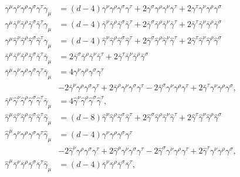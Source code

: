 \documentclass[../FeynCalcManual.tex]{subfiles}
\begin{document}
\begin{align}
\gamma^\mu \gamma^\nu \gamma^\rho \gamma^\sigma \gamma^\tau \gamma_\mu &= (d-4) \gamma^\nu \gamma^\rho \gamma^\sigma \gamma^\tau + 2 \gamma^\sigma \gamma^\rho \gamma^\nu \gamma^\tau + 2 \gamma^\tau \gamma^\nu \gamma^\rho \gamma^\sigma \\
\gamma^\mu \bar{\gamma}^\nu \bar{\gamma}^\rho \bar{\gamma}^\sigma \bar{\gamma}^\tau \gamma_\mu &= (d-4) \bar{\gamma}^\nu \bar{\gamma}^\rho \bar{\gamma}^\sigma \bar{\gamma}^\tau + 2 \bar{\gamma}^\sigma \bar{\gamma}^\rho \bar{\gamma}^\nu  \bar{\gamma}^\tau + 2 \bar{\gamma}^\tau \bar{\gamma}^\nu \bar{\gamma}^\rho  \bar{\gamma}^\sigma \\
\gamma^\mu \hat{\gamma}^\nu \hat{\gamma}^\rho \hat{\gamma}^\sigma \hat{\gamma}^\tau \gamma_\mu &= (d-4) \hat{\gamma}^\nu \hat{\gamma}^\rho \hat{\gamma}^\sigma \hat{\gamma}^\tau +2 \hat{\gamma}^\sigma \hat{\gamma}^\rho \hat{\gamma}^\nu \hat{\gamma}^\tau + 2\hat{\gamma}^\tau \hat{\gamma}^\nu \hat{\gamma}^\rho \hat{\gamma}^\sigma  \\
\bar{\gamma}^\mu \bar{\gamma}^\nu \bar{\gamma}^\rho \bar{\gamma}^\sigma \bar{\gamma}^\tau \bar{\gamma}_\mu &= 2 \bar{\gamma}^\sigma \bar{\gamma}^\rho \bar{\gamma}^\nu \bar{\gamma}^\tau + 2 \bar{\gamma}^\tau \bar{\gamma}^\nu \bar{\gamma}^\rho \bar{\gamma}^\sigma \\
\bar{\gamma}^\mu \gamma^\nu \gamma^\rho  \gamma^\sigma \gamma^\tau \bar{\gamma}_\mu &= 4 \gamma^\nu \gamma^\rho \gamma^\sigma \gamma^\tau \\
&- 2 \bar{\gamma}^\nu \gamma^\rho \gamma^\sigma \gamma^\tau + 2\bar{\gamma}^\rho \gamma^\nu \gamma^\sigma \gamma^\tau - 2 \bar{\gamma}^\sigma \gamma^\nu \gamma^\rho \gamma^\tau + 2 \bar{\gamma}^\tau \gamma^\nu \gamma^\rho \gamma^\sigma, \\
\bar{\gamma}^\mu \hat{\gamma}^\nu \hat{\gamma}^\rho \hat{\gamma}^\sigma \hat{\gamma}^\tau \bar{\gamma}_\mu &= 4 \hat{\gamma}^\nu \hat{\gamma}^\rho \hat{\gamma}^\sigma \hat{\gamma}^\tau , \\
\hat{\gamma}^\mu \hat{\gamma}^\nu \hat{\gamma}^\rho \hat{\gamma}^\sigma \hat{\gamma}^\tau \hat{\gamma}_\mu &= (d-8) \hat{\gamma}^\nu \hat{\gamma}^\rho \hat{\gamma}^\sigma \hat{\gamma}^\tau + 2  \hat{\gamma}^\sigma \hat{\gamma}^\rho \hat{\gamma}^\nu \hat{\gamma}^\tau + 2 \hat{\gamma}^\tau \hat{\gamma}^\nu \hat{\gamma}^\rho \hat{\gamma}^\sigma \\
\hat{\gamma}^\mu \gamma^\nu \gamma^\rho \gamma^\sigma \gamma^\tau \hat{\gamma}_\mu &= (d-4) \gamma^\nu \gamma^\rho \gamma^\sigma \gamma^\tau \\
&- 2 \hat{\gamma}^\nu \gamma^\rho \gamma^\sigma \gamma^\tau + 2\hat{\gamma}^\rho \gamma^\nu \gamma^\sigma \gamma^\tau - 2 \hat{\gamma}^\sigma \gamma^\nu \gamma^\rho \gamma^\tau + 2 \hat{\gamma}^\tau \gamma^\nu \gamma^\rho \gamma^\sigma,  \\
\hat{\gamma}^\mu \bar{\gamma}^\nu \bar{\gamma}^\rho \bar{\gamma}^\sigma \bar{\gamma}^\tau \hat{\gamma}_\mu &= (d-4) \bar{\gamma}^\nu \bar{\gamma}^\rho \bar{\gamma}^\sigma \bar{\gamma}^\tau,
\end{align}
\end{document}
